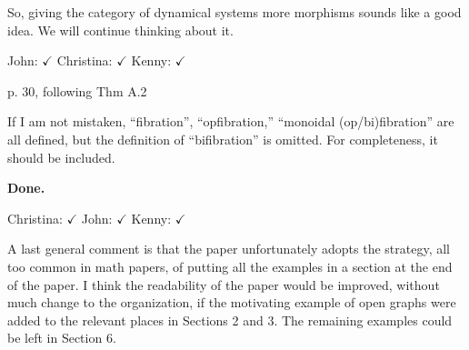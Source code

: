 \documentclass[reqno]{amsart}
\def\chris{\color{purple} Christina: }
\def\john{\color{red} John: }
\def\kenny{\color{blue} Kenny: }
\begin{document}
\begin{enumerate}
{{So, giving the category of dynamical systems more morphisms sounds like a good idea. We will continue thinking about it.}  

{ \john $\checkmark$} {\chris $\checkmark$} {\kenny $\checkmark$}


\iffalse
{\chris This looks similar to comment 30.}

{\john Yes, but it's worth a separate answer.   I wrote an answer above.  See if you like it.  }

{\chris Sounds good! However I am a bit stuck on the following. Remember also in 
\href{https://thalis.math.upatras.gr/~cvasilak/documents/MonGroth.pdf}{MonoidalGrothendieck}, we had this issue of a lax monoidal pseudofunctor not 
really being a lax monoidal functor in the split case, whatever I mean here. This also arised for Brendan's graph if I am not wrong. Really what is 
going on is that for a (strictly) lax monoidal functor into Cat, the laxator is strictly natural and associativity is an equality, whereas a (weakly) 
lax monoidal functor into Cat may be strict as a functor, but the laxator is still pseudonatural and associativity still an isomorphism, as per our 
diagram (5). So I am not 100\% sure the starting statement in the second paragraph above is true. Let us think about that for a moment, it may end up 
being true in this case.}

{\john  Oh-ho!  In this response I don't want to get pulled into any subtle math questions that aren't  actually necessary.  I was just trying to give 
the referee a pat on the back.  See if you like my new simplified reply, and bless it with a check mark if you do.}
\fi

\item p. 30, following Thm A.2

If I am not mistaken, “fibration”, “opfibration,” “monoidal (op/bi)fibration” are all defined, but the definition of “bifibration” is omitted. For 
completeness, it should be included.

{\bf Done.} 

{\chris $\checkmark$} {\john $\checkmark$}  {\kenny $\checkmark$}

\item A last general comment is that the paper unfortunately adopts the strategy, all too common in math papers, of putting all the examples in a 
section at 
the end of the paper. I think the readability of the paper would be improved, without much change to the organization, if the motivating example of 
open graphs were added to the relevant places in Sections 2 and 3. The remaining examples could be left in Section 6.

}
\end{enumerate}
\end{document}
